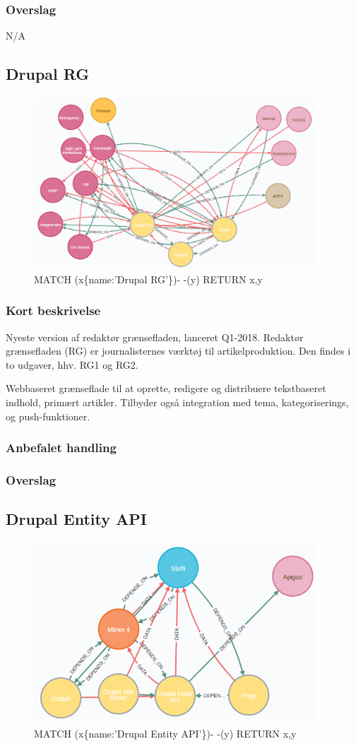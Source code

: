 \documentclass{article}
\begin{document}
\subsubsection{Overslag}
N/A

\subsection{Drupal RG}
\begin{figure}[h]
\includegraphics[width=300pt]{DrupalRG.PNG}
\caption{MATCH (x\{name:'Drupal RG'\})- -(y) RETURN x,y}
\end{figure}
\subsubsection{Kort beskrivelse}
Nyeste version af redaktør grænsefladen, lanceret Q1-2018. Redaktør grænsefladen (RG) er journalisternes værktøj til artikelproduktion. Den findes i to udgaver, hhv. RG1 og RG2.	

Webbaseret grænseflade til at oprette, redigere og distribuere tekstbaseret indhold, primært artikler. Tilbyder også integration med tema, kategoriserings, og push-funktioner.
\subsubsection{Anbefalet handling}
\subsubsection{Overslag}


\subsection{Drupal Entity API}
\begin{figure}[h]
\includegraphics[width=300pt]{DrupalEntityAPI.PNG}
\caption{MATCH (x\{name:'Drupal Entity API'\})- -(y) RETURN x,y}
\end{figure}
\end{document}
